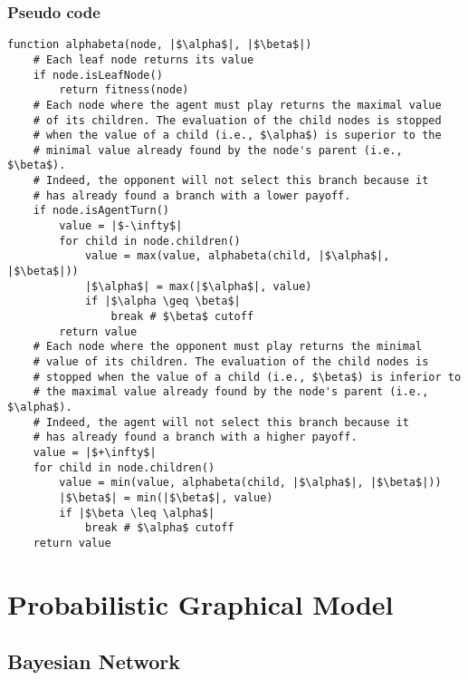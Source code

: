 \documentclass[11pt,fleqn]{book} %
\begin{document}
\subsection*{Pseudo code}

\begin{verbatim}
function alphabeta(node, |$\alpha$|, |$\beta$|)
    # Each leaf node returns its value
    if node.isLeafNode()
        return fitness(node)
    # Each node where the agent must play returns the maximal value 
    # of its children. The evaluation of the child nodes is stopped 
    # when the value of a child (i.e., $\alpha$) is superior to the 
    # minimal value already found by the node's parent (i.e., $\beta$).
    # Indeed, the opponent will not select this branch because it 
    # has already found a branch with a lower payoff.
    if node.isAgentTurn()
        value = |$-\infty$|
        for child in node.children()
            value = max(value, alphabeta(child, |$\alpha$|, |$\beta$|))
            |$\alpha$| = max(|$\alpha$|, value)
            if |$\alpha \geq \beta$|
                break # $\beta$ cutoff
        return value
    # Each node where the opponent must play returns the minimal 
    # value of its children. The evaluation of the child nodes is 
    # stopped when the value of a child (i.e., $\beta$) is inferior to 
    # the maximal value already found by the node's parent (i.e., $\alpha$).
    # Indeed, the agent will not select this branch because it 
    # has already found a branch with a higher payoff.
    value = |$+\infty$|
    for child in node.children()
        value = min(value, alphabeta(child, |$\alpha$|, |$\beta$|))
        |$\beta$| = min(|$\beta$|, value)
        if |$\beta \leq \alpha$|
            break # $\alpha$ cutoff
    return value
\end{verbatim}


\chapter{Probabilistic Graphical Model}

\section{Bayesian Network}
\end{document}
